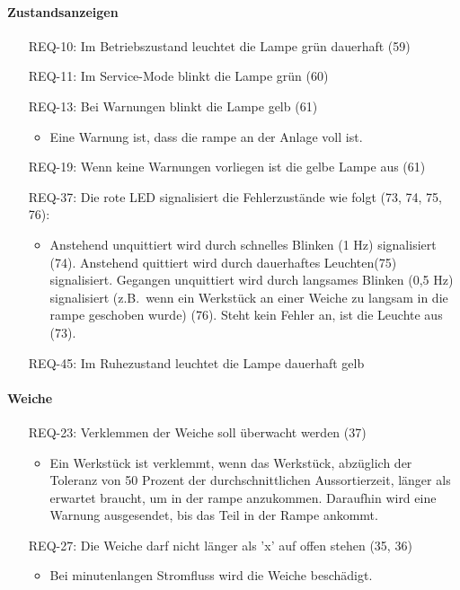 \paragraph{Zustandsanzeigen}
\begin{itemize}
    \item[REQ-10:] Im Betriebszustand leuchtet die Lampe grün dauerhaft (59)
    \item[REQ-11:] Im Service-Mode blinkt die Lampe grün (60)
    \item[REQ-13:] Bei Warnungen blinkt die Lampe gelb (61)
    \begin{itemize}
        \item Eine Warnung ist, dass die \gls{rampe} an der Anlage voll ist.
    \end{itemize}
    \item[REQ-19:] Wenn keine Warnungen vorliegen ist die gelbe Lampe aus (61)
    \item[REQ-37:] Die rote LED signalisiert die Fehlerzustände wie folgt (73, 74, 75, 76):
    \begin{itemize}
        \item Anstehend unquittiert wird durch schnelles Blinken (1 Hz) signalisiert (74).
        Anstehend quittiert wird durch dauerhaftes Leuchten(75) signalisiert.
        Gegangen unquittiert wird durch langsames Blinken (0,5 Hz) signalisiert (z.B.\ wenn ein
        Werkstück an einer Weiche zu langsam in die \gls{rampe} geschoben wurde) (76).
        Steht kein Fehler an, ist die Leuchte aus (73).
    \end{itemize}
    \item[REQ-45:] Im Ruhezustand leuchtet die Lampe dauerhaft gelb
\end{itemize}

\paragraph{Weiche}
\begin{itemize}
    \item[REQ-23:] Verklemmen der Weiche soll überwacht werden (37)
    \begin{itemize}
        \item Ein Werkstück ist verklemmt, wenn das Werkstück, abzüglich der Toleranz von 50 Prozent
        der durchschnittlichen Aussortierzeit, länger als erwartet braucht, um in der \gls{rampe} anzukommen.
        Daraufhin wird eine Warnung ausgesendet, bis das Teil in der Rampe ankommt.
    \end{itemize}
    \item[REQ-27:] Die Weiche darf nicht länger als 'x' auf offen stehen (35, 36)
    \begin{itemize}
        \item Bei minutenlangen Stromfluss wird die Weiche beschädigt.
    \end{itemize}
\end{itemize}

